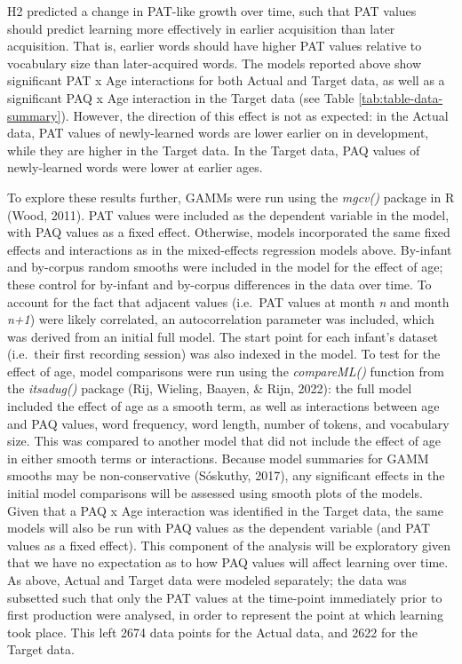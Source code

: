 \documentclass[
  man]{apa6}
\begin{document}
H2 predicted a change in PAT-like growth over time, such that PAT values should predict learning more effectively in earlier acquisition than later acquisition. That is, earlier words should have higher PAT values relative to vocabulary size than later-acquired words. The models reported above show significant PAT x Age interactions for both Actual and Target data, as well as a significant PAQ x Age interaction in the Target data (see Table \ref{tab:table-data-summary}). However, the direction of this effect is not as expected: in the Actual data, PAT values of newly-learned words are lower earlier on in development, while they are higher in the Target data. In the Target data, PAQ values of newly-learned words were lower at earlier ages.

To explore these results further, GAMMs were run using the \emph{mgcv()} package in R (Wood, 2011). PAT values were included as the dependent variable in the model, with PAQ values as a fixed effect. Otherwise, models incorporated the same fixed effects and interactions as in the mixed-effects regression models above. By-infant and by-corpus random smooths were included in the model for the effect of age; these control for by-infant and by-corpus differences in the data over time. To account for the fact that adjacent values (i.e.~PAT values at month \emph{n} and month \emph{n+1}) were likely correlated, an autocorrelation parameter was included, which was derived from an initial full model. The start point for each infant's dataset (i.e.~their first recording session) was also indexed in the model. To test for the effect of age, model comparisons were run using the \emph{compareML()} function from the \emph{itsadug()} package (Rij, Wieling, Baayen, \& Rijn, 2022): the full model included the effect of age as a smooth term, as well as interactions between age and PAQ values, word frequency, word length, number of tokens, and vocabulary size. This was compared to another model that did not include the effect of age in either smooth terms or interactions. Because model summaries for GAMM smooths may be non-conservative (Sóskuthy, 2017), any significant effects in the initial model comparisons will be assessed using smooth plots of the models. Given that a PAQ x Age interaction was identified in the Target data, the same models will also be run with PAQ values as the dependent variable (and PAT values as a fixed effect). This component of the analysis will be exploratory given that we have no expectation as to how PAQ values will affect learning over time. As above, Actual and Target data were modeled separately; the data was subsetted such that only the PAT values at the time-point immediately prior to first production were analysed, in order to represent the point at which learning took place. This left 2674 data points for the Actual data, and 2622 for the Target data.
\end{document}
